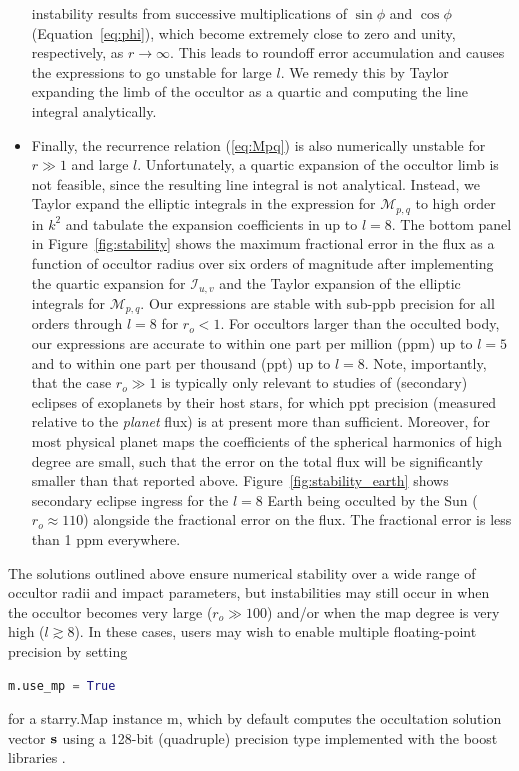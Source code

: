 \documentclass[modern]{aastex61}
\begin{document}
\begin{itemize}
instability results from successive multiplications of $\sin\phi$  and $\cos\phi$ (Equation~\ref{eq:phi}),
which become extremely close to zero and unity, respectively, as $r \rightarrow \infty$. This leads
to roundoff error accumulation and causes the expressions to go unstable for large $l$.
We remedy this by Taylor expanding the limb of the occultor as a quartic and computing the line integral
analytically.
%
\item Finally, the recurrence relation (\ref{eq:Mpq}) is also numerically unstable for $r \gg 1$ and large $l$.
Unfortunately, a quartic expansion of the occultor limb is not feasible, since the resulting line
integral is not analytical. Instead, we Taylor expand the elliptic integrals in the expression for $\mathcal{M}_{p,q}$
to high order in $k^2$ and tabulate the expansion coefficients in \starry up to $l = 8$.
The bottom panel in Figure~\ref{fig:stability} shows the maximum fractional error in the flux
as a function of occultor radius over six orders of magnitude after implementing the quartic expansion
for $\mathcal{I}_{u,v}$ and the Taylor expansion of the elliptic integrals for $\mathcal{M}_{p,q}$.
Our expressions are stable with sub-ppb precision for all orders through $l = 8$ for $r_o < 1$.
For occultors larger than the occulted body, our expressions are accurate to within
one part per million (ppm) up to $l = 5$ and to within one part per thousand (ppt) up to $l = 8$.
Note, importantly, that the case $r_o \gg 1$ is typically only relevant to studies of
(secondary) eclipses of exoplanets by their host stars, for which ppt precision (measured relative
to the \emph{planet} flux) is at present more than sufficient. Moreover, for most physical planet maps
the coefficients of the spherical harmonics of high degree are small, such that the error on the
total flux will be significantly smaller than that reported above.
Figure~\ref{fig:stability_earth} shows secondary eclipse ingress for the $l = 8$ Earth being
occulted by the Sun ($r_o \approx 110$) alongside the fractional error on the flux.
The fractional error is less than 1 ppm everywhere.
\end{itemize}

The solutions outlined above ensure numerical stability over a wide range of occultor radii and impact
parameters, but instabilities may still occur in \starry when the occultor becomes very large
($r_o \gg 100$) and/or when the map degree is very high ($l \gtrsim 8$). In these cases, users may wish
to enable multiple floating-point precision by setting
%
\begin{lstlisting}[language=Python,firstnumber=last]
m.use_mp = True
\end{lstlisting}
%
for a \textsf{starry.Map} instance \textsf{m}, which by default computes the occultation solution
vector ${\mathbf{s}}$ using a 128-bit (quadruple) precision type implemented with the \textsf{boost}
\cpp libraries \citep[e.g.,][]{Schaling2014}.
\end{document}
